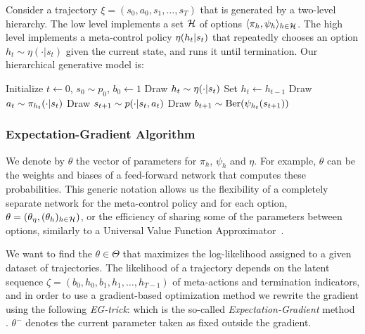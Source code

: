 Consider a trajectory $\xi=(s_0,a_0,s_1,\ldots,s_T)$ that is generated by a two-level hierarchy. The low level implements a set $\mathcal{H}$ of options $\langle \pi_h, \psi_h \rangle_{h\in\mathcal{H}}$. The high level implements a meta-control policy $\eta(h_t \vert s_t)$ that repeatedly chooses an option $h_t\sim\eta(\cdot|s_t)$ given the current state, and runs it until termination. Our hierarchical generative model is:
\begin{algorithmic}
    \State Initialize $t\gets0$, $s_0 \sim p_0$, $b_0 \gets 1$
            \State Draw $h_t \sim \eta(\cdot \vert s_t)$
        \Else{}
            \State Set $h_t \gets h_{t-1}$
        \EndIf
        \State Draw $a_t \sim \pi_{h_t}(\cdot \vert s_t)$
	\State Draw $s_{t+1} \sim p(\cdot \vert s_t, a_t)$
	\State Draw $b_{t+1} \sim \mathrm{Ber}(\psi_{h_t}(s_{t+1}))$
    \EndFor
\end{algorithmic}


\subsubsection{Expectation-Gradient Algorithm}
We denote by $\theta$ the vector of parameters for $\pi_h$, $\psi_h$ and $\eta$. For example, $\theta$ can be the weights and biases of a feed-forward network that computes these probabilities. This generic notation allows us the flexibility of a completely separate network for the meta-control policy and for each option, $\theta=(\theta_\eta,(\theta_h)_{h\in\mathcal{H}})$, or the efficiency of sharing some of the parameters between options, similarly to a Universal Value Function Approximator~\cite{schaul2015universal}.

We want to find the $\theta\in\Theta$ that maximizes the log-likelihood assigned to a given dataset of trajectories. The likelihood of a trajectory depends on the latent sequence $\zeta = (b_0,h_0,b_1,h_1,\ldots,h_{T-1})$ of meta-actions and termination indicators, and in order to use a gradient-based optimization method we rewrite the gradient using the following \emph{EG-trick}:
which is the so-called \emph{Expectation-Gradient} method \cite{salakhutdinov2003optimization,mclachlan2007algorithm}. $\theta^-$ denotes the current parameter taken as fixed outside the gradient.

